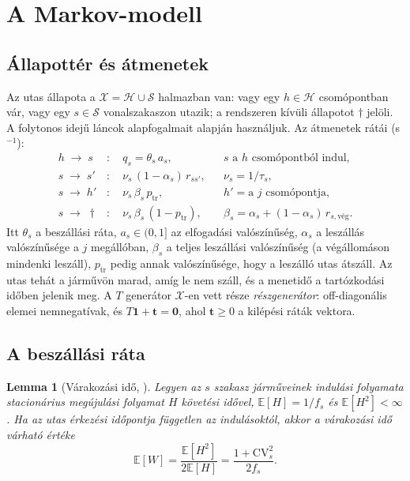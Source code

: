 \documentclass[12pt,a4paper]{article}
\newtheorem{lemma}[tetel]{Lemma}
\theoremstyle{definition}
\theoremstyle{remark}
\newcommand{\E}{\mathbb{E}}
\newcommand{\one}{\mathbf{1}}
\newcommand{\Hs}{\mathcal{H}}
\newcommand{\Ss}{\mathcal{S}}
\newcommand{\Xs}{\mathcal{X}}
\begin{document}
\section{A Markov-modell}
\label{sec:modell}

\subsection{Állapottér és átmenetek}

Az utas állapota a $\Xs=\Hs\cup\Ss$ halmazban van: vagy egy $h\in\Hs$
csomópontban vár, vagy egy $s\in\Ss$ vonalszakaszon utazik; a rendszeren
kívüli állapotot $\dagger$ jelöli. A folytonos idejű láncok alapfogalmait
\citet{norris1997} alapján használjuk. Az átmenetek rátái (s$^{-1}$):
\begin{align}
  h\;\to\;s &: \quad q_s=\theta_s\,a_s, && s \text{ a } h \text{ csomópontból indul},
  \label{eq:board}\\
  s\;\to\;s' &: \quad \nu_s\,(1-\alpha_s)\,r_{ss'}, && \nu_s=1/\tau_s,
  \label{eq:stay}\\
  s\;\to\;h' &: \quad \nu_s\,\beta_s\,p_{\mathrm{tr}}, && h'=\text{a } j \text{ csomópontja},
  \label{eq:transfer}\\
  s\;\to\;\dagger &: \quad \nu_s\,\beta_s\,(1-p_{\mathrm{tr}}),
  && \beta_s=\alpha_s+(1-\alpha_s)\,r_{s,\text{vég}} .
  \label{eq:exit}
\end{align}
Itt $\theta_s$ a beszállási ráta, $a_s\in(0,1]$ az elfogadási valószínűség,
$\alpha_s$ a leszállás valószínűsége a $j$ megállóban, $\beta_s$ a teljes
leszállási valószínűség (a végállomáson mindenki leszáll), $p_{\mathrm{tr}}$
pedig annak valószínűsége, hogy a leszálló utas átszáll. Az utas tehát a
járművön marad, amíg le nem száll, és a menetidő a tartózkodási időben
jelenik meg. A $T$ generátor $\Xs$-en vett része \emph{részgenerátor}:
off-diagonális elemei nemnegatívak, és $T\one+\bm t=\bm 0$, ahol
$\bm t\ge0$ a kilépési ráták vektora.

\subsection{A beszállási ráta}

\begin{lemma}[Várakozási idő, \citealp{larson1981}]
\label{lem:varakozas}
Legyen az $s$ szakasz járműveinek indulási folyamata stacionárius
megújulási folyamat $H$ követési idővel, $\E[H]=1/f_s$ és $\E[H^2]<\infty$.
Ha az utas érkezési időpontja független az indulásoktól, akkor a várakozási
idő várható értéke
\[
  \E[W]=\frac{\E[H^2]}{2\E[H]}=\frac{1+\mathrm{CV}_s^2}{2f_s}.
\]
\end{lemma}
\end{document}
